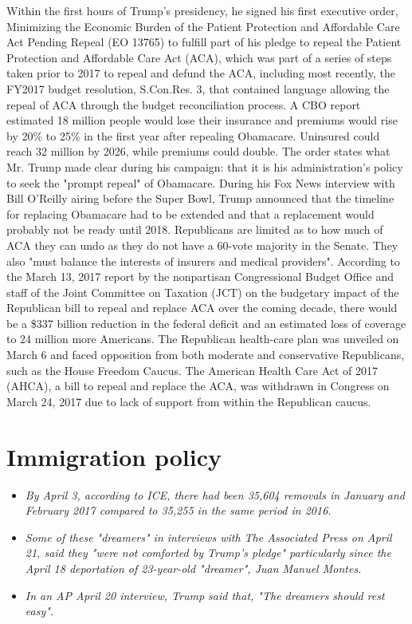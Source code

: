 Within the first hours of Trump's presidency, he signed his first
executive order, Minimizing the Economic Burden of the Patient
Protection and Affordable Care Act Pending Repeal (EO 13765) to fulfill
part of his pledge to repeal the Patient Protection and Affordable Care
Act (ACA), which was part of a series of steps taken prior to 2017 to
repeal and defund the ACA, including most recently, the FY2017 budget
resolution, S.Con.Res. 3, that contained language allowing the repeal of
ACA through the budget reconciliation process. A CBO report estimated 18
million people would lose their insurance and premiums would rise by
20\% to 25\% in the first year after repealing Obamacare. Uninsured
could reach 32 million by 2026, while premiums could double. The order
states what Mr. Trump made clear during his campaign: that it is his
administration's policy to seek the "prompt repeal" of Obamacare. During
his Fox News interview with Bill O'Reilly airing before the Super Bowl,
Trump announced that the timeline for replacing Obamacare had to be
extended and that a replacement would probably not be ready until 2018.
Republicans are limited as to how much of ACA they can undo as they do
not have a 60-vote majority in the Senate. They also "must balance the
interests of insurers and medical providers". According to the March 13,
2017 report by the nonpartisan Congressional Budget Office and staff of
the Joint Committee on Taxation (JCT) on the budgetary impact of the
Republican bill to repeal and replace ACA over the coming decade, there
would be a \$337 billion reduction in the federal deficit and an
estimated loss of coverage to 24 million more Americans. The Republican
health-care plan was unveiled on March 6 and faced opposition from both
moderate and conservative Republicans, such as the House Freedom Caucus.
The American Health Care Act of 2017 (AHCA), a bill to repeal and
replace the ACA, was withdrawn in Congress on March 24, 2017 due to lack
of support from within the Republican caucus.

\section{Immigration policy}\label{immigration-policy}

\begin{itemize}
\item
  \emph{By April 3, according to ICE, there had been 35,604 removals in
  January and February 2017 compared to 35,255 in the same period in
  2016.}
\item
  \emph{Some of these "dreamers" in interviews with The Associated Press
  on April 21, said they "were not comforted by Trump's pledge"
  particularly since the April 18 deportation of 23-year-old "dreamer",
  Juan Manuel Montes.}
\item
  \emph{In an AP April 20 interview, Trump said that, "The dreamers
  should rest easy".}
\end{itemize}

